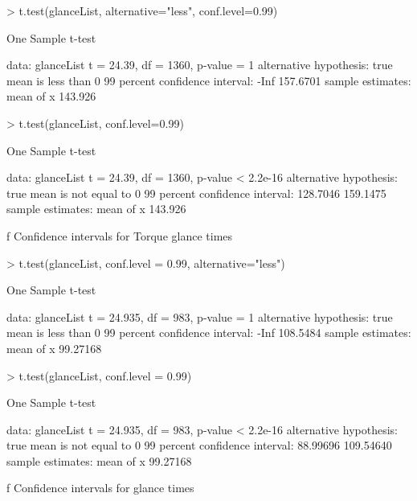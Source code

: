 {
\begtt
> t.test(glanceList, alternative="less", conf.level=0.99)

        One Sample t-test

data:  glanceList
t = 24.39, df = 1360, p-value = 1
alternative hypothesis: true mean is less than 0
99 percent confidence interval:
     -Inf 157.6701
sample estimates:
mean of x 
  143.926 

> t.test(glanceList, conf.level=0.99)

        One Sample t-test

data:  glanceList
t = 24.39, df = 1360, p-value < 2.2e-16
alternative hypothesis: true mean is not equal to 0
99 percent confidence interval:
 128.7046 159.1475
sample estimates:
mean of x 
  143.926 
\endtt
}\caption/f Confidence intervals for Torque glance times
\medskip

{
\begtt
> t.test(glanceList, conf.level = 0.99, alternative="less")

        One Sample t-test

data:  glanceList
t = 24.935, df = 983, p-value = 1
alternative hypothesis: true mean is less than 0
99 percent confidence interval:
     -Inf 108.5484
sample estimates:
mean of x 
 99.27168 

> t.test(glanceList, conf.level = 0.99)

        One Sample t-test

data:  glanceList
t = 24.935, df = 983, p-value < 2.2e-16
alternative hypothesis: true mean is not equal to 0
99 percent confidence interval:
  88.99696 109.54640
sample estimates:
mean of x 
 99.27168 
\endtt
}\caption/f Confidence intervals for  glance times
\medskip


